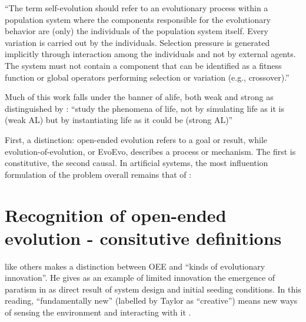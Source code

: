 ``The term self-evolution should refer to an evolutionary process within a population system where the components responsible for the evolutionary behavior are (only) the individuals of the population
system itself. Every variation is carried out by the individuals. Selection pressure is generated implicitly through interaction among the individuals and not by external agents. The system must not contain a component that can be identified as a fitness function or global operators performing selection or variation (e.g., crossover).'' \cite{Dittrich1998}

Much of this work falls under the banner of \gls{alife}, both weak and strong as distinguished by \cite{Langton1989}: ``study the phenomena of life, not by simulating life as it is (weak AL) but by instantiating life as it could be (strong AL)''

First, a distinction: open-ended evolution refers to a goal or result, while evolution-of-evolution, or EvoEvo, describes a process or mechanism. The first is constitutive, the second causal. In artificial systems, the most influention formulation of the problem overall remains that of \cite{Bedau:2000mi}:


\section{Recognition of open-ended evolution - consitutive definitions}

\parencite{Taylor2001} like others makes a distinction between OEE and ``kinds of evolutionary innovation''. He gives as an example of limited innovation the emergence of paratism in \cite{Ray1991} as direct result of system design and initial seeding conditions. In this reading, ``fundamentally new'' (labelled by Taylor as ``creative'') means new ways of sensing the environment and interacting with it \cite{Taylor2001}.


